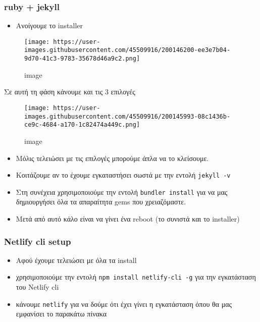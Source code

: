 \documentclass[
]{article}
\begin{document}
\hypertarget{ruby-jekyll}{%
\subsubsection{ruby + jekyll}\label{ruby-jekyll}}

\begin{itemize}
\item
  Ανοίγουμε το installer
\end{itemize}

\begin{figure}
\centering
\texttt{[image: https://user-images.githubusercontent.com/45509916/200146200-ee3e7b04-9d70-41c3-9783-35678d46a9c2.png]}
\caption{image}
\end{figure}

Σε αυτή τη φάση κάνουμε και τις 3 επιλογές

\begin{figure}
\centering
\texttt{[image: https://user-images.githubusercontent.com/45509916/200145993-08c1436b-ce9c-4684-a170-1c82474a449c.png]}
\caption{image}
\end{figure}

\begin{itemize}
\item
  Μόλις τελειώσει με τις επιλογές μπορούμε άπλα να το κλείσουμε.
\item
  Κοιτάζουμε αν το έχουμε εγκαταστήσει σωστά με την εντολή
  \texttt{jekyll~-v}
\item
  Στη συνέχεια χρησιμοποιούμε την εντολή \texttt{bundler~install} για να
  μας δημιουργήσει όλα τα απαραίτητα gems που χρειαζόμαστε.
\item
  Μετά από αυτό κάλο είναι να γίνει ένα reboot (το συνιστά και το
  installer)
\end{itemize}

\hypertarget{netlify-cli-setup}{%
\subsubsection{Netlify cli setup}\label{netlify-cli-setup}}

\begin{itemize}
\item
  Αφού έχουμε τελειώσει με όλα τα install
\item
  χρησιμοποιούμε την εντολή \texttt{npm~install~netlify-cli~-g} για την
  εγκατάσταση του Netlify cli
\item
  κάνουμε \texttt{netlify} για να δούμε ότι έχει γίνει η εγκατάσταση
  όπου θα μας εμφανίσει το παρακάτω πίνακα
\end{itemize}
\end{document}
